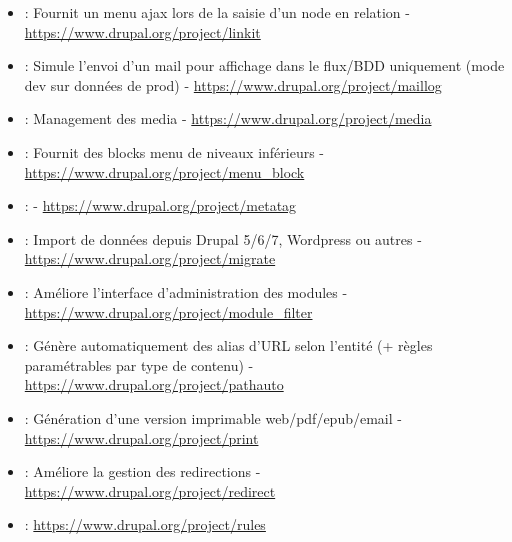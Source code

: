 \documentclass[a4paper,11pt,french]{rtdsphinxmanual}
\begin{document}
\begin{itemize}
\item {} 
 : Fournit un menu ajax lors de la saisie d'un node en relation - \href{https://www.drupal.org/project/linkit}{https://www.drupal.org/project/linkit}

\item {} 
 : Simule l'envoi d'un mail pour affichage dans le flux/BDD uniquement (mode dev sur données de prod) - \href{https://www.drupal.org/project/maillog}{https://www.drupal.org/project/maillog}

\item {} 
 : Management des media - \href{https://www.drupal.org/project/media}{https://www.drupal.org/project/media}

\item {} 
 : Fournit des blocks menu de niveaux inférieurs - \href{https://www.drupal.org/project/menu\_block}{https://www.drupal.org/project/menu\_block}

\item {} 
 : - \href{https://www.drupal.org/project/metatag}{https://www.drupal.org/project/metatag}

\item {} 
 : Import de données depuis Drupal 5/6/7, Wordpress ou autres - \href{https://www.drupal.org/project/migrate}{https://www.drupal.org/project/migrate}

\item {} 
 : Améliore l'interface d'administration des modules - \href{https://www.drupal.org/project/module\_filter}{https://www.drupal.org/project/module\_filter}

\item {} 
 : Génère automatiquement des alias d'URL selon l'entité (+ règles paramétrables par type de contenu) - \href{https://www.drupal.org/project/pathauto}{https://www.drupal.org/project/pathauto}

\item {} 
 : Génération d'une version imprimable web/pdf/epub/email - \href{https://www.drupal.org/project/print}{https://www.drupal.org/project/print}

\item {} 
 : Améliore la gestion des redirections - \href{https://www.drupal.org/project/redirect}{https://www.drupal.org/project/redirect}

\item {} 
 : \href{https://www.drupal.org/project/rules}{https://www.drupal.org/project/rules}


\end{itemize}
\end{document}
